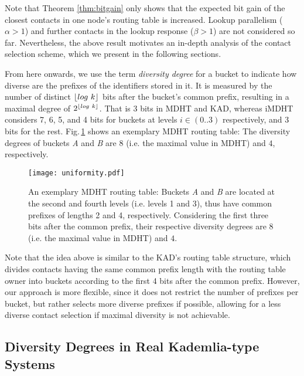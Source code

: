 \documentclass[10pt, conference, compsocconf, letterpaper]{IEEEtran}
\DeclarePairedDelimiter{\floor}{\lfloor}{\rfloor}
\begin{document}
Note that Theorem \ref{thm:bitgain} only shows that the expected bit gain of the closest
contacts in one node's routing table is increased. Lookup parallelism ($\alpha>1$) and further contacts in the lookup response ($\beta > 1$) are not considered so far. Nevertheless, the above result motivates an in-depth analysis of the contact selection scheme, which we present in the following sections.

From here onwards, we use the term \emph{diversity degree} for a bucket to indicate how diverse are the prefixes of the identifiers stored in it. It is measured by the number of distinct $\floor*{log~k}$ bits after the bucket's common prefix, resulting in a maximal degree of  $2^{\floor*{log~k}}$. That is 3 bits in MDHT and KAD, whereas iMDHT considers 7, 6, 5, and 4 bits for buckets at levels $i \in (0..3)$ respectively, and 3 bits for the rest. Fig.\,\ref{fig:uniformity} shows an exemplary MDHT routing table: The diversity degrees of buckets \textit{A} and \textit{B} are $8$ (i.e. the maximal value in MDHT) and $4$, respectively.

\begin{figure} \centering
\captionsetup{font=scriptsize}
      \texttt{[image: uniformity.pdf]}
   \caption{An exemplary MDHT routing table: Buckets \textit{A} and \textit{B} are located at the second and fourth levels (i.e. levels 1 and 3), thus have common prefixes of lengths 2 and 4, respectively. Considering the first three bits after the common prefix, their respective diversity degrees are $8$ (i.e. the maximal value in MDHT) and $4$.}
   \label{fig:uniformity}
\end{figure}

Note that the idea above is similar to the KAD's routing table structure, which divides contacts having the same common prefix length with the routing table owner into buckets according to the first 4 bits after the common prefix. However, our approach is more flexible, since it does not restrict the number of prefixes per bucket, but rather selects more diverse prefixes if possible, allowing for a less diverse contact selection if maximal diversity is not achievable. 



\subsection{Diversity Degrees in Real Kademlia-type Systems} \label{subsec:real_diverse}
\end{document}

